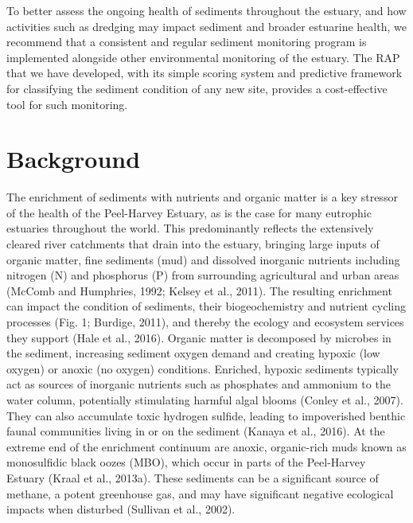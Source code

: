 \documentclass[
]{book}
\begin{document}
To better assess the ongoing health of sediments throughout the estuary, and how activities such as dredging may impact sediment and broader estuarine health, we recommend that a consistent and regular sediment monitoring program is implemented alongside other environmental monitoring of the estuary. The RAP that we have developed, with its simple scoring system and predictive framework for classifying the sediment condition of any new site, provides a cost-effective tool for such monitoring.

\hypertarget{background-3}{%
\section{Background}\label{background-3}}

The enrichment of sediments with nutrients and organic matter is a key stressor of the health of the Peel-Harvey Estuary, as is the case for many eutrophic estuaries throughout the world. This predominantly reflects the extensively cleared river catchments that drain into the estuary, bringing large inputs of organic matter, fine sediments (mud) and dissolved inorganic nutrients including nitrogen (N) and phosphorus (P) from surrounding agricultural and urban areas (McComb and Humphries, 1992; Kelsey et al., 2011). The resulting enrichment can impact the condition of sediments, their biogeochemistry and nutrient cycling processes (Fig. 1; Burdige, 2011), and thereby the ecology and ecosystem services they support (Hale et al., 2016). Organic matter is decomposed by microbes in the sediment, increasing sediment oxygen demand and creating hypoxic (low oxygen) or anoxic (no oxygen) conditions. Enriched, hypoxic sediments typically act as sources of inorganic nutrients such as phosphates and ammonium to the water column, potentially stimulating harmful algal blooms (Conley et al., 2007). They can also accumulate toxic hydrogen sulfide, leading to impoverished benthic faunal communities living in or on the sediment (Kanaya et al., 2016). At the extreme end of the enrichment continuum are anoxic, organic-rich muds known as monosulfidic black oozes (MBO), which occur in parts of the Peel-Harvey Estuary (Kraal et al., 2013a). These sediments can be a significant source of methane, a potent greenhouse gas, and may have significant negative ecological impacts when disturbed (Sullivan et al., 2002).
\end{document}
